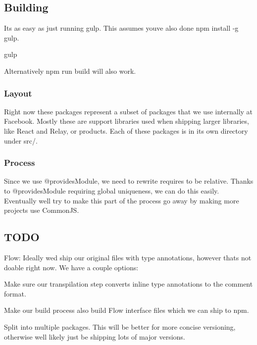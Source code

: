 \subsection*{Building}

It\textquotesingle{}s as easy as just running gulp. This assumes you\textquotesingle{}ve also done {\ttfamily npm install -\/g gulp}.


\begin{DoxyCode}
gulp
\end{DoxyCode}


Alternatively {\ttfamily npm run build} will also work.

\subsubsection*{Layout}

Right now these packages represent a subset of packages that we use internally at Facebook. Mostly these are support libraries used when shipping larger libraries, like React and Relay, or products. Each of these packages is in its own directory under {\ttfamily src/}.

\subsubsection*{Process}

Since we use {\ttfamily @provides\+Module}, we need to rewrite requires to be relative. Thanks to {\ttfamily @provides\+Module} requiring global uniqueness, we can do this easily. Eventually we\textquotesingle{}ll try to make this part of the process go away by making more projects use Common\+JS.

\subsection*{T\+O\+DO}


\begin{DoxyItemize}
\item Flow\+: Ideally we\textquotesingle{}d ship our original files with type annotations, however that\textquotesingle{}s not doable right now. We have a couple options\+:
\begin{DoxyItemize}
\item Make sure our transpilation step converts inline type annotations to the comment format.
\item Make our build process also build Flow interface files which we can ship to npm.
\end{DoxyItemize}
\item Split into multiple packages. This will be better for more concise versioning, otherwise we\textquotesingle{}ll likely just be shipping lots of major versions. 
\end{DoxyItemize}